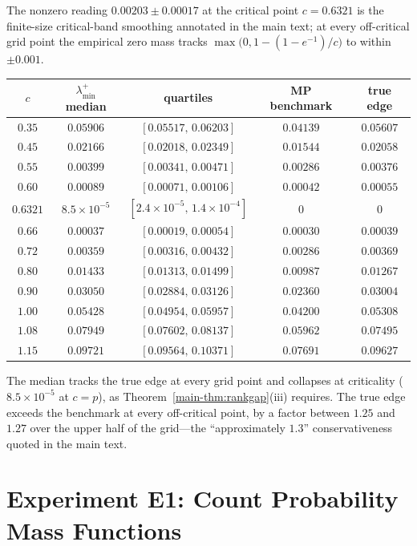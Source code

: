 \documentclass[10pt,onecolumn]{IEEEtran}
\theoremstyle{remark}
\begin{document}
The nonzero reading $0.00203\pm0.00017$ at the critical point $c=0.6321$ is
the finite-size critical-band smoothing annotated in the main text; at every
off-critical grid point the empirical zero mass tracks
$\max\big(0,1-(1-e^{-1})/c\big)$ to within $\pm0.001$.

\begin{center}
\renewcommand{\arraystretch}{1.15}
\begin{tabular}{ccccc}
\toprule
$c$ & $\lambda_{\min}^{+}$ median & quartiles & MP benchmark & true edge \\
\midrule
$0.35$   & $0.05906$ & $[0.05517,\,0.06203]$ & $0.04139$ & $0.05607$ \\
$0.45$   & $0.02166$ & $[0.02018,\,0.02349]$ & $0.01544$ & $0.02058$ \\
$0.55$   & $0.00399$ & $[0.00341,\,0.00471]$ & $0.00286$ & $0.00376$ \\
$0.60$   & $0.00089$ & $[0.00071,\,0.00106]$ & $0.00042$ & $0.00055$ \\
$0.6321$ & $8.5\times10^{-5}$ & $[2.4\times10^{-5},\,1.4\times10^{-4}]$ & $0$ & $0$ \\
$0.66$   & $0.00037$ & $[0.00019,\,0.00054]$ & $0.00030$ & $0.00039$ \\
$0.72$   & $0.00359$ & $[0.00316,\,0.00432]$ & $0.00286$ & $0.00369$ \\
$0.80$   & $0.01433$ & $[0.01313,\,0.01499]$ & $0.00987$ & $0.01267$ \\
$0.90$   & $0.03050$ & $[0.02884,\,0.03126]$ & $0.02360$ & $0.03004$ \\
$1.00$   & $0.05428$ & $[0.04954,\,0.05957]$ & $0.04200$ & $0.05308$ \\
$1.08$   & $0.07949$ & $[0.07602,\,0.08137]$ & $0.05962$ & $0.07495$ \\
$1.15$   & $0.09721$ & $[0.09564,\,0.10371]$ & $0.07691$ & $0.09627$ \\
\bottomrule
\end{tabular}
\end{center}

The median tracks the true edge at every grid point and collapses at
criticality ($8.5\times10^{-5}$ at $c=p$), as Theorem~\ref{main-thm:rankgap}(iii) requires. The
true edge exceeds the benchmark at every off-critical point, by a factor
between $1.25$ and $1.27$ over the upper half of the grid---the
``approximately $1.3$'' conservativeness quoted in the main text.

\section{Experiment E1: Count Probability Mass Functions}\label{sec:S25}
\end{document}
